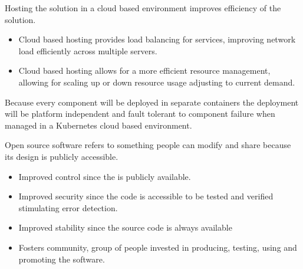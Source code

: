\begin{description}[font=$\bullet$~\normalfont\scshape\color{red!50!black}]
\item[Efficiency]     
        Hosting the solution in a cloud based environment improves efficiency of the solution. 
		\begin{itemize}
			\item Cloud based hosting provides load balancing for services, improving network load efficiently across multiple servers.
			\item Cloud based hosting allows for a more efficient resource management, allowing for scaling up or down resource usage adjusting to current demand.
		\end{itemize}		        
         

\item[Infrastructure Agnostic]     
        Because every component will be deployed in separate containers the deployment will be platform independent and fault tolerant to component failure when managed in a Kubernetes cloud based environment.

\item[Open source]     
        Open source software refers to something people can modify and share because its design is publicly accessible.
        \begin{itemize}
        	\item Improved control since the is publicly available.
        	\item Improved security since the code is accessible to be tested and verified stimulating error detection.
        	\item Improved stability since the source code is always available
        	\item Fosters community, group of people invested in producing, testing, using and promoting the software.
        \end{itemize}

\end{description}